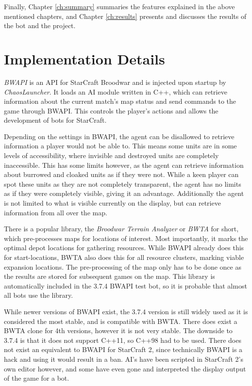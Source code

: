 Finally, Chapter \ref{ch:summary} summaries the features explained in the above mentioned chapters, and Chapter \ref{ch:results} presents and discusses the results of the bot and the project.

\section{Implementation Details}
\emph{BWAPI} is an API for StarCraft Broodwar and is injected upon startup by \emph{ChaosLauncher}. It loads an AI module written in C++, which can retrieve information about the current match's map status and send commands to the game through BWAPI. This controls the player's actions and allows the development of bots for StarCraft.

Depending on the settings in BWAPI, the agent can be disallowed to retrieve information a player would not be able to. This means some units are in some levels of accessibility, where invisible and destroyed units are completely inaccessible. This has some limits however, as the agent can retrieve information about burrowed and cloaked units as if they were not. While a keen player can spot these units as they are not completely transparent, the agent has no limits as if they were completely visible, giving it an advantage. Additionally the agent is not limited to what is visible currently on the display, but can retrieve information from all over the map.

There is a popular library, the \emph{Broodwar Terrain Analyzer} or \emph{BWTA} for short, which pre-processes maps for locations of interest. Most importantly, it marks the optimal depot locations for gathering resources. While BWAPI already does this for start-locations, BWTA also does this for all resource clusters, marking viable expansion locations. The pre-processing of the map only has to be done once as the results are stored for subsequent games on the map. This library is automatically included in the 3.7.4 BWAPI test bot, so it is probable that almost all bots use the library.

While newer versions of BWAPI exist, the 3.7.4 version is still widely used as it is considered the most stable, and is compatible with BWTA. There does exist a BWTA clone for 4th versions, however it is not very stable. The downside to 3.7.4 is that it does not support C++11, so C++98 had to be used. There does not exist an equivalent to BWAPI for StarCraft 2, since technically BWAPI is a hack and using it would result in a ban. AI's have been scripted in StarCraft 2's own editor however, and some have even gone and interpreted the display output of the game for a bot.

